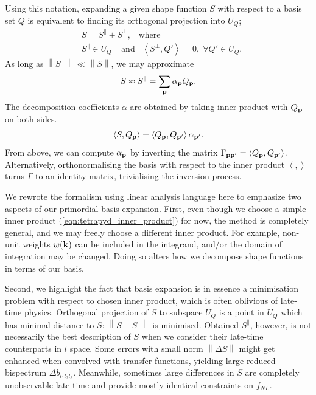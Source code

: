 Using this notation, expanding a given shape function $S$ with respect to a basis set $Q$ is equivalent to finding its orthogonal projection into $U_{Q}$;
\begin{align}
	&S = S^{\parallel} + S^{\perp}, \;\;\;\text{where} \\
	&S^{\parallel} \in U_Q \;\;\;\;\text{and} \;\;\; \left< S^{\perp}, Q' \right> = 0, \; \forall Q' \in U_Q.
\end{align}
As long as $\left\| S^\perp \right\| \ll \left\| S \right\|$, we may approximate
\begin{align}
	S \approx S^\parallel = \sum_{\mathbf{p}} \alpha_{\mathbf{p}} Q_{\mathbf{p}}.  \label{eqn:primordial_basis_projection}
\end{align}
The decomposition coefficients $\alpha$ are obtained by taking inner product with $Q_{\mathbf{p}}$ on both sides.
\begin{align}
	\left< S, Q_\mathbf{p} \right> = \left< Q_\mathbf{p}, Q_{\mathbf{p}'} \right> \alpha_{\mathbf{p}'}. \label{eqn:primordial_basis_expansion_SQ_and_QQ}
\end{align}
From above, we can compute $\alpha_\mathbf{p}$ by inverting the matrix $\Gamma_{\mathbf{p} \mathbf{p}'} = \left< Q_\mathbf{p}, Q_{\mathbf{p}'} \right>$. Alternatively, orthonormalising the basis with respect to the inner product $\left< , \right>$ turns $\Gamma$ to an identity matrix, trivialising the inversion process.

We rewrote the formalism using linear analysis language here to emphasize two aspects of our primordial basis expansion. First, even though we choose a simple inner product (\ref{eqn:tetrapyd_inner_product}) for now, the method is completely general, and we may freely choose a different inner product. For example, non-unit weights $w(\mathbf{k})$ can be included in the integrand, and/or the domain of integration may be changed. Doing so alters how we decompose shape functions in terms of our basis.

Second, we highlight the fact that basis expansion is in essence a minimisation problem with respect to chosen inner product, which is often oblivious of late-time physics. Orthogonal projection of $S$ to subspace $U_Q$ is a point in $U_Q$ which has minimal distance to $S$: $\left\| S - S^\parallel \right\|$ is minimised. Obtained $S^\parallel$, however, is not necessarily the best description of $S$ when we consider their late-time counterparts in $l$ space. Some errors with small norm $\left\| \Delta S \right\|$ might get enhanced when convolved with transfer functions, yielding large reduced bispectrum $\Delta b_{l_1 l_2 l_3}$. Meanwhile, sometimes large differences in $S$ are completely unobservable late-time and provide mostly identical constraints on $f_{NL}$.

